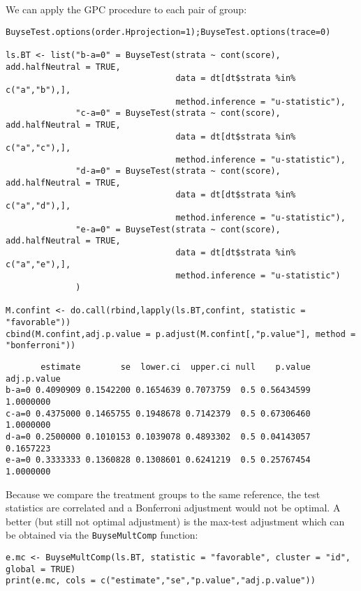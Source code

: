 \documentclass[12pt]{article}
\begin{document}
We can apply the GPC procedure to each pair of group:
\lstset{language=r,label= ,caption= ,captionpos=b,numbers=none}
\begin{lstlisting}
BuyseTest.options(order.Hprojection=1);BuyseTest.options(trace=0)

ls.BT <- list("b-a=0" = BuyseTest(strata ~ cont(score), add.halfNeutral = TRUE,
                                  data = dt[dt$strata %in% c("a","b"),],
                                  method.inference = "u-statistic"),
              "c-a=0" = BuyseTest(strata ~ cont(score), add.halfNeutral = TRUE,
                                  data = dt[dt$strata %in% c("a","c"),],
                                  method.inference = "u-statistic"),
              "d-a=0" = BuyseTest(strata ~ cont(score), add.halfNeutral = TRUE,
                                  data = dt[dt$strata %in% c("a","d"),],
                                  method.inference = "u-statistic"),
              "e-a=0" = BuyseTest(strata ~ cont(score), add.halfNeutral = TRUE,
                                  data = dt[dt$strata %in% c("a","e"),],
                                  method.inference = "u-statistic")
              )

M.confint <- do.call(rbind,lapply(ls.BT,confint, statistic = "favorable"))
cbind(M.confint,adj.p.value = p.adjust(M.confint[,"p.value"], method = "bonferroni"))
\end{lstlisting}

\begin{verbatim}
       estimate        se  lower.ci  upper.ci null    p.value adj.p.value
b-a=0 0.4090909 0.1542200 0.1654639 0.7073759  0.5 0.56434599   1.0000000
c-a=0 0.4375000 0.1465755 0.1948678 0.7142379  0.5 0.67306460   1.0000000
d-a=0 0.2500000 0.1010153 0.1039078 0.4893302  0.5 0.04143057   0.1657223
e-a=0 0.3333333 0.1360828 0.1308601 0.6241219  0.5 0.25767454   1.0000000
\end{verbatim}



Because we compare the treatment groups to the same reference, the
test statistics are correlated and a Bonferroni adjustment would not
be optimal. A better (but still not optimal adjustment) is the
max-test adjustment which can be obtained via the \texttt{BuyseMultComp} function:
\lstset{language=r,label= ,caption= ,captionpos=b,numbers=none}
\begin{lstlisting}
e.mc <- BuyseMultComp(ls.BT, statistic = "favorable", cluster = "id", global = TRUE)
print(e.mc, cols = c("estimate","se","p.value","adj.p.value"))
\end{lstlisting}
\end{document}
